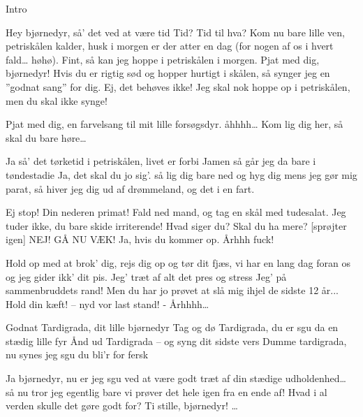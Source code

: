 \documentclass[a4paper,11pt]{article}
\begin{document}
\begin{song}
\scene Intro 

   Hey bjørnedyr, så' det ved at være tid
   Tid? Tid til hva?
   Kom nu bare lille ven, petriskålen kalder, husk i morgen er der atter en dag (for nogen af os i hvert fald… høhø).
   Fint, så kan jeg hoppe i petriskålen i morgen.
   Pjat med dig, bjørnedyr! Hvis du er rigtig sød og hopper hurtigt i skålen, så synger jeg en ”godnat sang” for dig.
   Ej, det behøves ikke! Jeg skal nok hoppe op i petriskålen, men du skal ikke synge!


   Pjat med dig, en farvelsang til mit lille forsøgsdyr.
   åhhhh…
   Kom lig dig her, så skal du bare høre…

   Ja så’ det tørketid i petriskålen, livet er forbi
   Jamen så går jeg da bare i tøndestadie
   Ja, det skal du jo sig’. så lig dig bare ned og hyg dig mens jeg gør mig parat, så hiver jeg dig ud af drømmeland, og det i en fart.
  
  
 Ej stop! Din nederen primat!
 Fald ned mand, og tag en skål med tudesalat.
 Jeg tuder ikke, du bare skide irriterende!
 Hvad siger du? Skal du ha mere? [sprøjter igen]
 NEJ! GÅ NU VÆK!
 Ja, hvis du kommer op.
 Århhh fuck!

Hold op med at brok' dig,
rejs dig op og tør dit fjæs,
vi har en lang dag foran os
og jeg gider ikk' dit pis.
Jeg’ træt af alt det pres og stress
Jeg’ på sammenbruddets rand!
 Men du har jo prøvet at slå mig ihjel de sidste 12 år...
 Hold din kæft! – nyd vor last stand!
- Århhhh…

Godnat Tardigrada, dit lille bjørnedyr
Tag og dø Tardigrada,
du er sgu da en stædig lille fyr
Ånd ud Tardigrada – og syng dit sidste vers
Dumme tardigrada, nu synes jeg sgu du bli’r for fersk


 Ja bjørnedyr, nu er jeg sgu ved at være godt træt af din stædige udholdenhed… så nu tror jeg egentlig bare vi prøver det hele igen fra en ende af!
 Hvad i al verden skulle det gøre godt for?
 Ti stille, bjørnedyr! …


\end{song}
\end{document}
